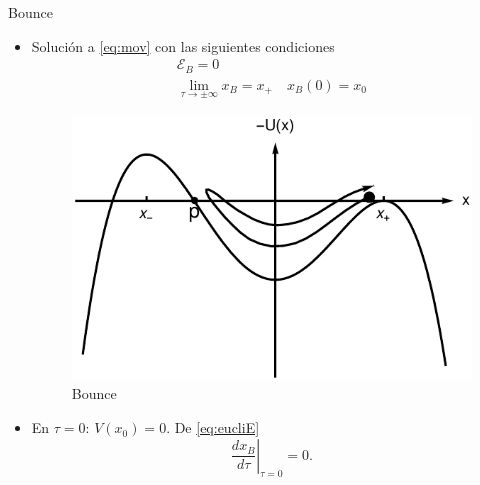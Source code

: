 \documentclass{beamer}
\theoremstyle{example}
\theoremstyle{example}
\begin{document}
\begin{frame}{Bounce}
\begin{itemize}
    \item Solución a \eqref{eq:mov} con las siguientes condiciones
    \begin{subequations} \label{eq:CI}
    \begin{gather} \label{eq:eucliE}
        \mathcal{E}_B = 0 \\ \label{eq:CI1}
        \lim_{\tau \rightarrow \pm \infty} x_B = x_+ \quad x_B (0) = x_0
    \end{gather}
    \end{subequations}
    
    \begin{figure}
        \centering
        \includegraphics[scale = 0.22]{bounce.png}
        \caption{Bounce}
        \label{fig:bounce}
    \end{figure}
    \item En $\tau = 0$: $V(x_0) = 0$. De \eqref{eq:eucliE}
    \begin{equation}\label{eq:vel}
        \left. \frac{dx_B}{d\tau} \right|_{\tau = 0} = 0.
    \end{equation}
\end{itemize}
\end{frame}
\end{document}
